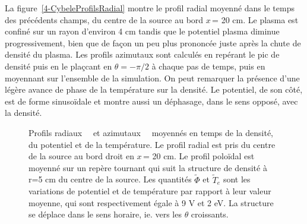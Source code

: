 \begin{refsection}
La figure~\ref{4-CybeleProfilsRadial} montre le profil radial moyenné dans le
temps des précédents champs, du centre de la source au bord $x\,$= 20 cm. Le
plasma est confiné sur un rayon d'environ 4 cm tandis que le potentiel plasma
diminue progressivement, bien que de façon un peu plus prononcée juste après la
chute de densité du plasma. 
Les profils azimutaux sont calculés en repérant le pic de
densité puis en le plaçcant en $\theta=-\pi/2$ à chaque pas de temps, puis en
moyennant sur l'ensemble de la simulation.
On peut remarquer la présence d'une légère avance de phase de la température sur la densité. Le potentiel, de son côté, est de forme
sinusoïdale et montre aussi un déphasage, dans le sens opposé, avec la densité.

\begin{figure}[!htbp]
  \centering
    \caption{Profils radiaux~~ et
    azimutaux~~ moyennés en temps de la densité, du
    potentiel et de la température. Le profil radial est pris du centre de la source au bord droit
    en $x\,$= 20 cm. Le profil poloïdal est moyenné sur un repère tournant qui
    suit la structure de densité à r=5 cm du centre de la source. Les quantités
    $\tilde{\Phi}$ et $\tilde{T}_e$ sont les variations de potentiel et de température par rapport à leur valeur
    moyenne, qui sont respectivement égale à 9 V et 2 eV. La structure se
    déplace dans le sens horaire, ie. vers les $\theta$ croissants.}
    \label{4-CybeleProfils}
\end{figure}


\end{refsection}
